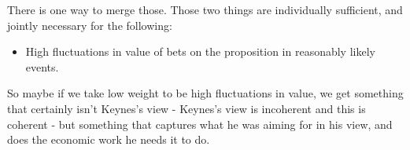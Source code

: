 \documentclass[
  11pt,
  letterpaper,
  DIV=11,
  numbers=noendperiod,
  oneside]{scrartcl}
\providecommand{\tightlist}{%
  \setlength{\itemsep}{0pt}\setlength{\parskip}{0pt}}\usepackage{longtable,booktabs,array}
\begin{document}
There is one way to merge those. Those two things are individually
sufficient, and jointly necessary for the following:

\begin{itemize}
\tightlist
\item
  High fluctuations in value of bets on the proposition in reasonably
  likely events.
\end{itemize}

So maybe if we take low weight to be high fluctuations in value, we get
something that certainly isn't Keynes's view - Keynes's view is
incoherent and this is coherent - but something that captures what he
was aiming for in his view, and does the economic work he needs it to
do.
\end{document}

